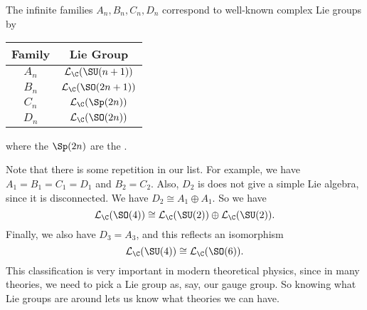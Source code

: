 \documentclass[a4paper]{article}
\begin{document}
\begin{thm}
\begin{center}
  \end{center}
  \begin{center}
  \end{center}
\end{thm}

\begin{eg}
  The infinite families $A_n, B_n, C_n, D_n$ correspond to well-known complex Lie groups by
  \begin{center}
    \begin{tabular}{cc}
      \toprule
      Family & Lie Group\\
      \midrule
      $A_n$ & $\mathcal{L}_\C(\SU(n + 1))$\\
      $B_n$ & $\mathcal{L}_\C(\SO(2n + 1))$\\
      $C_n$ & $\mathcal{L}_\C (\Sp(2n))$\\
      $D_n$ & $\mathcal{L}_\C (\SO(2n))$\\
      \bottomrule
    \end{tabular}
  \end{center}
  where the $\Sp(2n)$ are the .
\end{eg}

Note that there is some repetition in our list. For example, we have $A_1 = B_1 = C_1 = D_1$ and $B_2 = C_2$. Also, $D_2$ is does not give a simple Lie algebra, since it is disconnected. We have $D_2 \cong A_1 \oplus A_1$. So we have
\[
  \mathcal{L}_\C(\SO(4)) \cong \mathcal{L}_\C(\SU(2)) \oplus \mathcal{L}_\C(\SU(2)).
\]
Finally, we also have $D_3 = A_3$, and this reflects an isomorphism
\[
  \mathcal{L}_\C(\SU(4)) \cong \mathcal{L}_\C(\SO(6)).
\]
This classification is very important in modern theoretical physics, since in many theories, we need to pick a Lie group as, say, our gauge group. So knowing what Lie groups are around lets us know what theories we can have.
\end{document}
